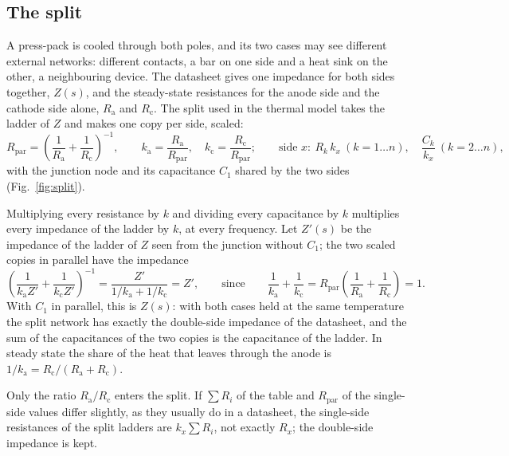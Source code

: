 \documentclass[10pt,a4paper]{scrartcl}
\newcommand{\Rpar}{R_\mathrm{par}}
\begin{document}
\subsection{The split}
A press-pack is cooled through both poles, and its two cases may see different external networks: different contacts, a bar on one side and a heat sink on the other, a neighbouring device. The datasheet gives one impedance for both sides together, $Z(s)$, and the steady-state resistances for the anode side and the cathode side alone, $R_\mathrm{a}$ and $R_\mathrm{c}$. The split used in the thermal model takes the ladder of $Z$ and makes one copy per side, scaled:
\begin{equation}
\Rpar = \left(\frac{1}{R_\mathrm{a}} + \frac{1}{R_\mathrm{c}}\right)^{-1} , \qquad k_\mathrm{a} = \frac{R_\mathrm{a}}{\Rpar} , \quad k_\mathrm{c} = \frac{R_\mathrm{c}}{\Rpar} ; \qquad
\text{side } x\!: \ R_k\, k_x \ (k = 1\ldots n) , \quad \frac{C_k}{k_x} \ (k = 2\ldots n) ,
\label{eq:split}
\end{equation}
with the junction node and its capacitance $C_1$ shared by the two sides (Fig.~\ref{fig:split}).

Multiplying every resistance by $k$ and dividing every capacitance by $k$ multiplies every impedance of the ladder by $k$, at every frequency. Let $Z'(s)$ be the impedance of the ladder of $Z$ seen from the junction without $C_1$; the two scaled copies in parallel have the impedance
\begin{equation}
\left(\frac{1}{k_\mathrm{a}Z'} + \frac{1}{k_\mathrm{c}Z'}\right)^{-1} = \frac{Z'}{1/k_\mathrm{a} + 1/k_\mathrm{c}} = Z' ,
\qquad\text{since}\qquad \frac{1}{k_\mathrm{a}} + \frac{1}{k_\mathrm{c}} = \Rpar\left(\frac{1}{R_\mathrm{a}} + \frac{1}{R_\mathrm{c}}\right) = 1 .
\end{equation}
With $C_1$ in parallel, this is $Z(s)$: with both cases held at the same temperature the split network has exactly the double-side impedance of the datasheet, and the sum of the capacitances of the two copies is the capacitance of the ladder. In steady state the share of the heat that leaves through the anode is $1/k_\mathrm{a} = R_\mathrm{c}/(R_\mathrm{a}+R_\mathrm{c})$.

Only the ratio $R_\mathrm{a}/R_\mathrm{c}$ enters the split. If $\sum R_i$ of the table and $\Rpar$ of the single-side values differ slightly, as they usually do in a datasheet, the single-side resistances of the split ladders are $k_x\sum R_i$, not exactly $R_x$; the double-side impedance is kept.
\end{document}
